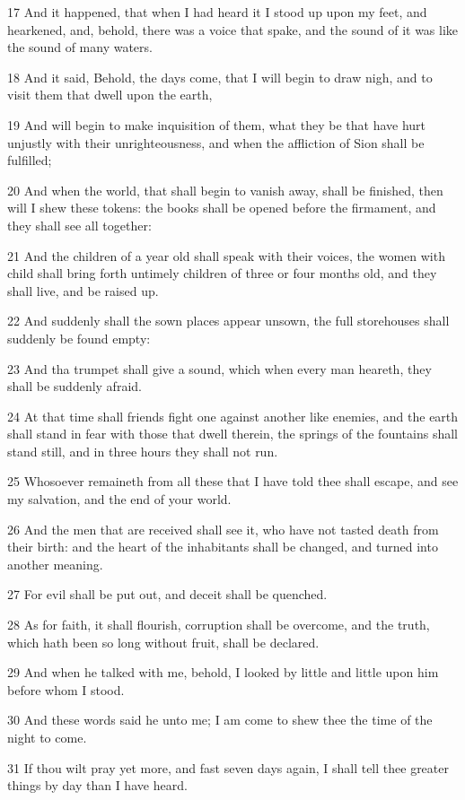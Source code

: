 \par 17 And it happened, that when I had heard it I stood up upon my feet, and hearkened, and, behold, there was a voice that spake, and the sound of it was like the sound of many waters.
\par 18 And it said, Behold, the days come, that I will begin to draw nigh, and to visit them that dwell upon the earth,
\par 19 And will begin to make inquisition of them, what they be that have hurt unjustly with their unrighteousness, and when the affliction of Sion shall be fulfilled;
\par 20 And when the world, that shall begin to vanish away, shall be finished, then will I shew these tokens: the books shall be opened before the firmament, and they shall see all together:
\par 21 And the children of a year old shall speak with their voices, the women with child shall bring forth untimely children of three or four months old, and they shall live, and be raised up.
\par 22 And suddenly shall the sown places appear unsown, the full storehouses shall suddenly be found empty:
\par 23 And tha trumpet shall give a sound, which when every man heareth, they shall be suddenly afraid.
\par 24 At that time shall friends fight one against another like enemies, and the earth shall stand in fear with those that dwell therein, the springs of the fountains shall stand still, and in three hours they shall not run.
\par 25 Whosoever remaineth from all these that I have told thee shall escape, and see my salvation, and the end of your world.
\par 26 And the men that are received shall see it, who have not tasted death from their birth: and the heart of the inhabitants shall be changed, and turned into another meaning.
\par 27 For evil shall be put out, and deceit shall be quenched.
\par 28 As for faith, it shall flourish, corruption shall be overcome, and the truth, which hath been so long without fruit, shall be declared.
\par 29 And when he talked with me, behold, I looked by little and little upon him before whom I stood.
\par 30 And these words said he unto me; I am come to shew thee the time of the night to come.
\par 31 If thou wilt pray yet more, and fast seven days again, I shall tell thee greater things by day than I have heard.
